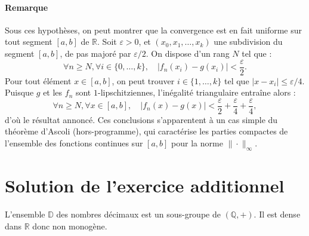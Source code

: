 \paragraph{Remarque} Sous ces hypothèses, on peut montrer que la convergence est en fait uniforme sur tout segment $[a,b]$ de $\mathbb R$. Soit $\varepsilon > 0$, et $(x_0,x_1,\dots,x_k)$ une subdivision du segment $[a,b]$, de pas majoré par $\varepsilon/2$. On dispose d'un rang $N$ tel que :
\[
\forall n\geqslant N,\forall i \in \{0,\dots,k\},\quad |f_n(x_i) - g(x_i)| < \frac{\varepsilon}2.
\]
Pour tout élément $x \in [a,b]$, on peut trouver $i \in \{1,\dots,k\}$ tel que $|x-x_i|\leqslant \varepsilon/4$. Puisque $g$ et les $f_n$ sont $1$-lipschitziennes, l'inégalité triangulaire entraîne alors :
\[
\forall n \geqslant N,\forall x \in [a,b],\quad |f_n(x) - g(x)| < \frac{\varepsilon}2 + \frac{\varepsilon}4 + \frac{\varepsilon}4,
\]
d'où le résultat annoncé.
Ces conclusions s'apparentent à un cas simple du théorème d'Ascoli (hors-programme), qui caractérise les parties compactes de l'ensemble des fonctions continues sur $[a,b]$ pour la norme $\|\cdot\|_\infty$.

\section{Solution de l'exercice additionnel} %

L'ensemble $\mathbb D$ des nombres décimaux est un sous-groupe de $(\mathbb Q,+)$. Il est dense dans $\mathbb R$ donc non monogène. 